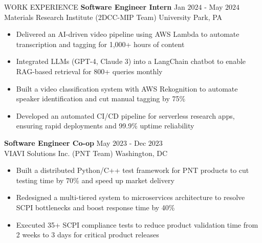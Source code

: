 \documentclass{resume} %
\begin{document}
\begin{rSection}{WORK EXPERIENCE}
{\bf Software Engineer Intern} \hfill Jan $2024$ - May $2024$\\
Materials Research Institute (2DCC-MIP Team) \hfill University Park, PA
\begin{itemize}[itemsep = -4pt]
    \item Delivered an AI-driven video pipeline using AWS Lambda to automate transcription and tagging for 1,000+ hours of content
    \item Integrated LLMs (GPT-4, Claude 3) into a LangChain chatbot to enable RAG-based retrieval for 800+ queries monthly
    \item Built a video classification system with AWS Rekognition to automate speaker identification and cut manual tagging by 75\%
    \item Developed an automated CI/CD pipeline for serverless research apps, ensuring rapid deployments and 99.9\% uptime reliability
\end{itemize}

{\bf Software Engineer Co-op} \hfill May $2023$ - Dec $2023$\\
VIAVI Solutions Inc. (PNT Team) \hfill Washington, DC
\begin{itemize}[itemsep = -4pt]
    \item Built a distributed Python/C++ test framework for PNT products to cut testing time by 70\% and speed up market delivery
    \item Redesigned a multi-tiered system to microservices architecture to resolve SCPI bottlenecks and boost response time by 40\%
    \item Executed 35+ SCPI compliance tests to reduce product validation time from 2 weeks to 3 days for critical product releases
\end{itemize}


\end{rSection}
\end{document}
